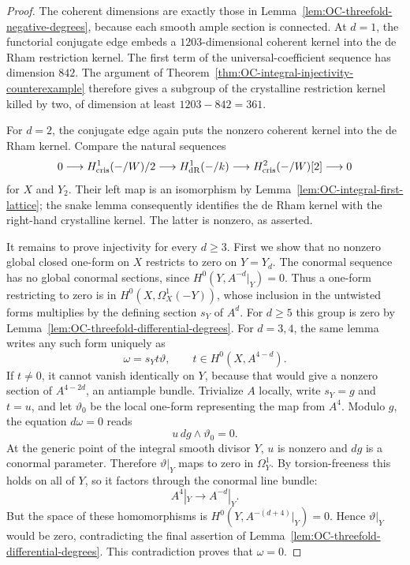 \begin{proof}
The coherent dimensions are exactly those in
Lemma~\ref{lem:OC-threefold-negative-degrees}, because each smooth ample section is connected.  At $d=1$, the functorial conjugate edge embeds a $1203$-dimensional coherent kernel into the de Rham restriction kernel.  The first term of the universal-coefficient sequence has dimension $842$.  The argument of Theorem~\ref{thm:OC-integral-injectivity-counterexample} therefore gives a subgroup of the crystalline restriction kernel killed by two, of dimension at least $1203-842=361$.

For $d=2$, the conjugate edge again puts the nonzero coherent kernel into the de Rham kernel.  Compare the natural sequences
\[
 0\longrightarrow H^1_{\mathrm{cris}}(-/W)/2
 \longrightarrow H^1_{\mathrm{dR}}(-/k)
 \longrightarrow H^2_{\mathrm{cris}}(-/W)[2]\longrightarrow0
\]
for $X$ and $Y_2$.  Their left map is an isomorphism by
Lemma~\ref{lem:OC-integral-first-lattice}; the snake lemma consequently identifies the de Rham kernel with the right-hand crystalline kernel.  The latter is nonzero, as asserted.

It remains to prove injectivity for every $d\geq3$.  First we show that no nonzero global closed one-form on $X$ restricts to zero on $Y=Y_d$.  The conormal sequence has no global conormal sections, since $H^0(Y,A^{-d}|_Y)=0$.  Thus a one-form restricting to zero is in
$H^0(X,\Omega_X^1(-Y))$, whose inclusion in the untwisted forms multiplies by the defining section $s_Y$ of $A^d$.
For $d\geq5$ this group is zero by
Lemma~\ref{lem:OC-threefold-differential-degrees}.
For $d=3,4$, the same lemma writes any such form uniquely as
\[
                         \omega=s_Y t\vartheta,
             \qquad t\in H^0(X,A^{4-d}).
\]
If $t\ne0$, it cannot vanish identically on $Y$, because that would give a nonzero section of $A^{4-2d}$, an antiample bundle.  Trivialize $A$ locally, write $s_Y=g$ and $t=u$, and let $\vartheta_0$ be the local one-form representing the map from $A^4$.  Modulo $g$, the equation $d\omega=0$ reads
\[
                            u\,dg\wedge\vartheta_0=0.
\]
At the generic point of the integral smooth divisor $Y$, $u$ is nonzero and $dg$ is a conormal parameter.  Therefore $\vartheta|_Y$ maps to zero in $\Omega_Y^1$.  By torsion-freeness this holds on all of $Y$, so it factors through the conormal line bundle:
\[
                         A^4|_Y\longrightarrow A^{-d}|_Y.
\]
But the space of these homomorphisms is
$H^0(Y,A^{-(d+4)}|_Y)=0$.  Hence $\vartheta|_Y$ would be zero, contradicting the final assertion of
Lemma~\ref{lem:OC-threefold-differential-degrees}.  This contradiction proves that $\omega=0$.


\end{proof}
